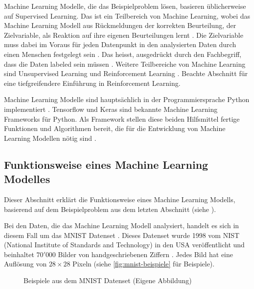 Machine Learning Modelle, die das Beispielproblem lösen, basieren üblicherweise
auf Supervised Learning. Das ist ein Teilbereich von Machine Learning, wobei das
Machine Learning Modell aus Rückmeldungen der korrekten Beurteilung, der
Zielvariable, als Reaktion auf ihre eigenen Beurteilungen lernt
\cite{laurenz_wuttke_was_2021-1}. Die Zielvariable muss dabei im Voraus für jeden
Datenpunkt in den analysierten Daten durch einen Menschen festgelegt sein
\cite{trahasch_31_2020}. Das heisst, ausgedrückt durch den Fachbegriff, dass
die Daten labeled sein müssen \cite{luis_g_serrano_21_2021}. Weitere Teilbereiche
von Machine Learning sind Unsupervised Learning und Reinforcement Learning
\cite{arora_supervised_2020}. Beachte Abschnitt  für eine
tiefgreifendere Einführung in Reinforcement Learning.
 
Machine Learning Modelle sind hauptsächlich in der Programmiersprache Python
implementiert \cite{sadie_bennett_why_2019}. Tensorflow und Keras sind bekannte
Machine Learning Frameworks für Python. Als Framework stellen diese beiden
Hilfsmittel fertige Funktionen und Algorithmen bereit, die für die Entwicklung
von Machine Learning Modellen nötig sind
\cite{noauthor_tensorflow_2015}\cite{noauthor_keras_2015}.
 
 
\subsection{Funktionsweise eines Machine Learning Modelles}\label{sub:t_ml_func}
Dieser Abschnitt erklärt die Funktionsweise eines Machine Learning Modells,
basierend auf dem Beispielproblem aus dem letzten Abschnitt (siehe ).
 
Bei den Daten, die das Machine Learning Modell analysiert, handelt es sich in
diesem Fall um das MNIST Datenset \cite{yann_lecun_mnist_nodate}. Dieses Datenset
wurde 1998 vom NIST (National Institute of Standards and Technology) in den USA
veröffentlicht und beinhaltet $70'000$ Bilder von handgeschriebenen Ziffern
\cite{yann_lecun_papers_nodate}. Jedes Bild hat eine Auflösung von $28\times28$
Pixeln (siehe \autoref{fig:mnist-beispiele} für Beispiele).
 
\begin{figure}[!ht]
   \centering
   \caption{Beispiele aus dem MNIST Datenset (Eigene Abbildung)}\label{fig:mnist-beispiele}
\end{figure}
 
